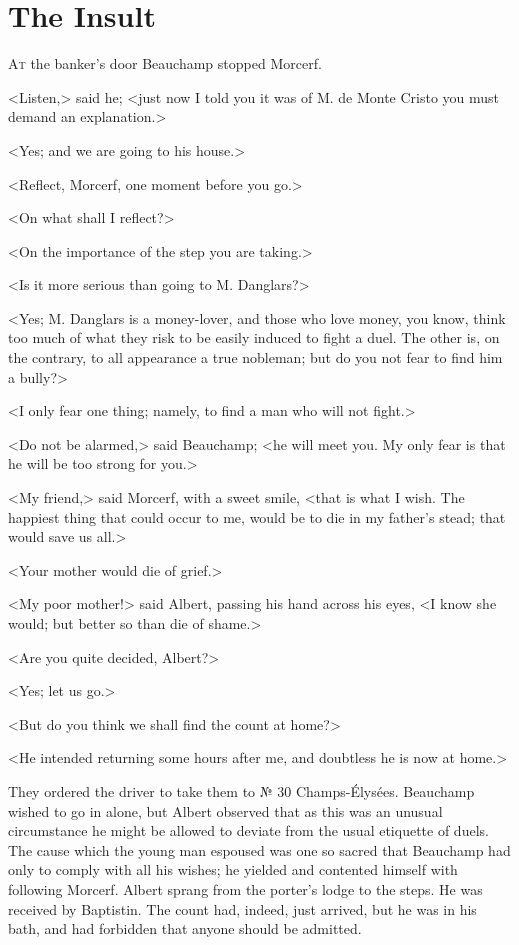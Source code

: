 \chapter{The Insult} 

 \lettrine{A}{t} the banker's door Beauchamp stopped Morcerf. 

 <Listen,> said he; <just now I told you it was of M. de Monte Cristo you must demand an explanation.> 

 <Yes; and we are going to his house.> 

 <Reflect, Morcerf, one moment before you go.> 

 <On what shall I reflect?> 

 <On the importance of the step you are taking.> 

 <Is it more serious than going to M. Danglars?> 

 <Yes; M. Danglars is a money-lover, and those who love money, you know, think too much of what they risk to be easily induced to fight a duel. The other is, on the contrary, to all appearance a true nobleman; but do you not fear to find him a bully?> 

 <I only fear one thing; namely, to find a man who will not fight.> 

 <Do not be alarmed,> said Beauchamp; <he will meet you. My only fear is that he will be too strong for you.> 

 <My friend,> said Morcerf, with a sweet smile, <that is what I wish. The happiest thing that could occur to me, would be to die in my father's stead; that would save us all.> 

 <Your mother would die of grief.> 

 <My poor mother!> said Albert, passing his hand across his eyes, <I know she would; but better so than die of shame.> 

 <Are you quite decided, Albert?> 

 <Yes; let us go.> 

 <But do you think we shall find the count at home?> 

 <He intended returning some hours after me, and doubtless he is now at home.> 

 They ordered the driver to take them to № 30 Champs-Élysées. Beauchamp wished to go in alone, but Albert observed that as this was an unusual circumstance he might be allowed to deviate from the usual etiquette of duels. The cause which the young man espoused was one so sacred that Beauchamp had only to comply with all his wishes; he yielded and contented himself with following Morcerf. Albert sprang from the porter's lodge to the steps. He was received by Baptistin. The count had, indeed, just arrived, but he was in his bath, and had forbidden that anyone should be admitted. 

